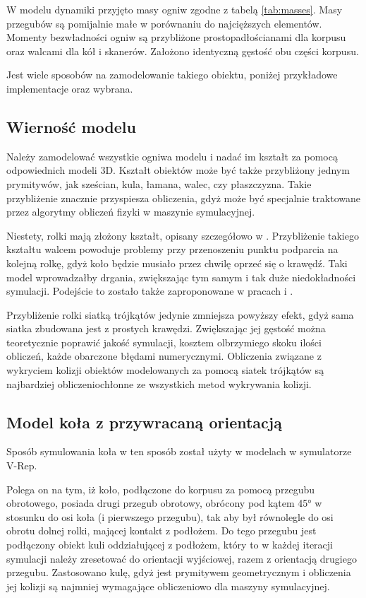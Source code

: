 	W modelu dynamiki przyjęto masy ogniw zgodne z tabelą \ref{tab:masses}.
	Masy przegubów są pomijalnie małe w porównaniu do najcięższych elementów.
	Momenty bezwładności ogniw są przybliżone prostopadłościanami dla korpusu oraz walcami dla kół i skanerów.
	Założono identyczną gęstość obu części korpusu.
	
	Jest wiele sposobów na zamodelowanie takiego obiektu, poniżej przykładowe implementacje oraz wybrana.
	
	\subsection{Wierność modelu}
		Należy zamodelować wszystkie ogniwa modelu i nadać im kształt za pomocą odpowiednich modeli 3D.
		Kształt obiektów może być także przybliżony jednym prymitywów, jak sześcian, kula, łamana, walec, czy płaszczyzna.
		Takie przybliżenie znacznie przyspiesza obliczenia, gdyż może być specjalnie traktowane przez algorytmy obliczeń fizyki
		w maszynie symulacyjnej.

		Niestety, rolki mają złożony kształt, opisany szczegółowo w \cite{rollers}.
		Przybliżenie takiego kształtu walcem powoduje problemy przy przenoszeniu punktu podparcia na kolejną rolkę, gdyż koło będzie musiało przez chwilę oprzeć się o krawędź.
		Taki model wprowadzałby drgania, zwiększając tym samym i tak duże niedokładności symulacji.
		Podejście to zostało także zaproponowane w pracach \cite{modelling_ways} i \cite{braking}.

		Przybliżenie rolki siatką trójkątów jedynie zmniejsza powyższy efekt, gdyż sama siatka zbudowana jest z prostych krawędzi.
		Zwiększając jej gęstość można teoretycznie poprawić jakość symulacji, kosztem olbrzymiego skoku ilości obliczeń, każde obarczone błędami numerycznymi.
		Obliczenia związane z wykryciem kolizji obiektów modelowanych za pomocą siatek trójkątów są najbardziej obliczeniochłonne ze wszystkich metod wykrywania kolizji. 

	\subsection{Model koła z przywracaną orientacją}
		Sposób symulowania koła w ten sposób został użyty w modelach w symulatorze V-Rep.

		Polega on na tym, iż koło, podłączone do korpusu za pomocą przegubu obrotowego, posiada drugi przegub obrotowy, 
		obrócony pod kątem 45° w stosunku do osi koła (i pierwszego przegubu), tak aby był równolegle do osi obrotu dolnej rolki, mającej kontakt z podłożem.
		Do tego przegubu jest podłączony obiekt kuli oddziałującej z podłożem, który to w każdej iteracji symulacji należy zresetować do orientacji wyjściowej, razem z
		orientacją drugiego przegubu.
		Zastosowano kulę, gdyż jest prymitywem geometrycznym i obliczenia jej kolizji są najmniej wymagające obliczeniowo dla maszyny symulacyjnej.

